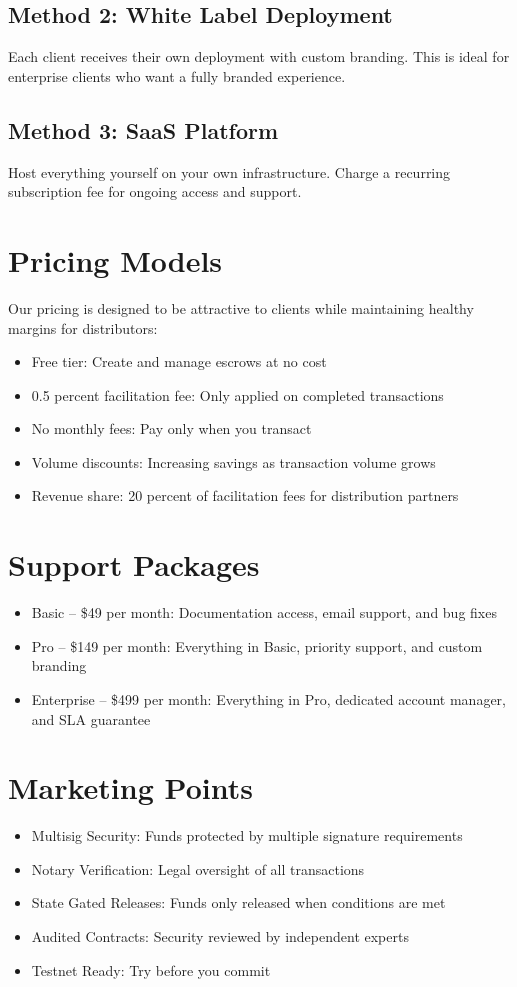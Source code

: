 \documentclass[11pt]{article}
\begin{document}
\subsection{Method 2: White Label Deployment}
Each client receives their own deployment with custom branding. This is ideal for enterprise clients who want a fully branded experience.

\subsection{Method 3: SaaS Platform}
Host everything yourself on your own infrastructure. Charge a recurring subscription fee for ongoing access and support.

\section{Pricing Models}
Our pricing is designed to be attractive to clients while maintaining healthy margins for distributors:

\begin{itemize}
\item Free tier: Create and manage escrows at no cost
\item 0.5 percent facilitation fee: Only applied on completed transactions
\item No monthly fees: Pay only when you transact
\item Volume discounts: Increasing savings as transaction volume grows
\item Revenue share: 20 percent of facilitation fees for distribution partners
\end{itemize}

\section{Support Packages}
\begin{itemize}
\item Basic -- \$49 per month: Documentation access, email support, and bug fixes
\item Pro -- \$149 per month: Everything in Basic, priority support, and custom branding
\item Enterprise -- \$499 per month: Everything in Pro, dedicated account manager, and SLA guarantee
\end{itemize}

\section{Marketing Points}
\begin{itemize}
\item Multisig Security: Funds protected by multiple signature requirements
\item Notary Verification: Legal oversight of all transactions
\item State Gated Releases: Funds only released when conditions are met
\item Audited Contracts: Security reviewed by independent experts
\item Testnet Ready: Try before you commit
\end{itemize}
\end{document}
